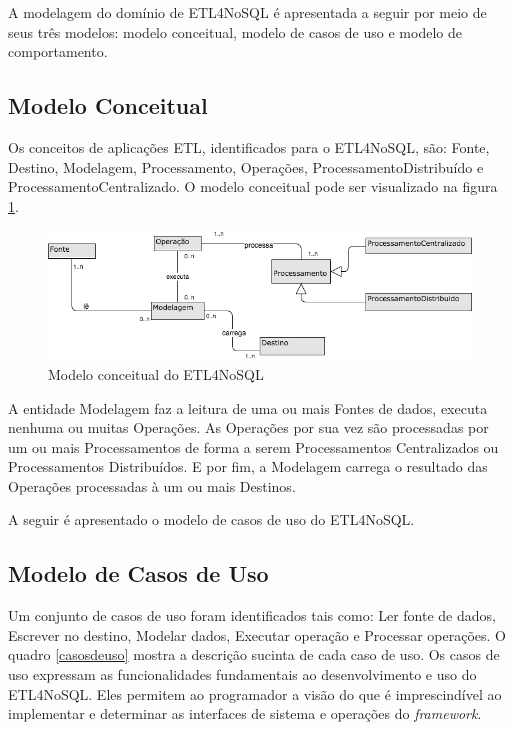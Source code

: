 A modelagem do domínio de ETL4NoSQL é apresentada a seguir por meio de seus três modelos: modelo conceitual, modelo de casos de uso e modelo de comportamento.

\subsection{Modelo Conceitual}

Os conceitos de aplicações ETL, identificados para o ETL4NoSQL, são: Fonte, Destino, Modelagem, Processamento, Operações, ProcessamentoDistribuído e ProcessamentoCentralizado. O modelo conceitual pode ser visualizado na figura \ref{modeloconceitual}.

\begin{figure}[h]
	\centering
	\includegraphics[scale=0.6]{fig/modeloconceitual.png}
	\caption{Modelo conceitual do ETL4NoSQL}
	\label{modeloconceitual}
\end{figure}

A entidade Modelagem faz a leitura de uma ou mais Fontes de dados, executa nenhuma ou muitas Operações. As Operações por sua vez são processadas por um ou mais Processamentos de forma a serem Processamentos Centralizados ou Processamentos Distribuídos. E por fim, a Modelagem carrega o resultado das Operações processadas à um ou mais Destinos.

A seguir é apresentado o modelo de casos de uso do ETL4NoSQL.

\subsection{Modelo de Casos de Uso}

Um conjunto de casos de uso foram identificados tais como: Ler fonte de dados, Escrever no destino, Modelar dados, Executar operação e Processar operações. O quadro \ref{casosdeuso} mostra a descrição sucinta de cada caso de uso. Os casos de uso expressam as funcionalidades fundamentais ao desenvolvimento e uso do ETL4NoSQL. Eles permitem ao programador a visão do que é imprescindível ao implementar e determinar as interfaces de sistema e operações do \textit{framework}. 

